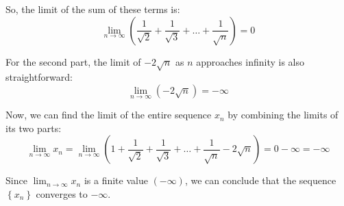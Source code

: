 \documentclass{report}
\begin{document}
So, the limit of the sum of these terms is:
$$
\lim _{n \rightarrow \infty}\left(\frac{1}{\sqrt{2}}+\frac{1}{\sqrt{3}}+\ldots+\frac{1}{\sqrt{n}}\right)=0
$$

For the second part, the limit of $-2 \sqrt{n}$ as $n$ approaches infinity is also straightforward:
$$
\lim _{n \rightarrow \infty}(-2 \sqrt{n})=-\infty
$$

Now, we can find the limit of the entire sequence $x_n$ by combining the limits of its two parts:
$$
\lim _{n \rightarrow \infty} x_n=\lim _{n \rightarrow \infty}\left(1+\frac{1}{\sqrt{2}}+\frac{1}{\sqrt{3}}+\ldots+\frac{1}{\sqrt{n}}-2 \sqrt{n}\right)=0-\infty=-\infty
$$

Since $\lim _{n \rightarrow \infty} x_n$ is a finite value $(-\infty)$, we can conclude that the sequence $\left\{x_n\right\}$ converges to $-\infty$.
\end{document}
